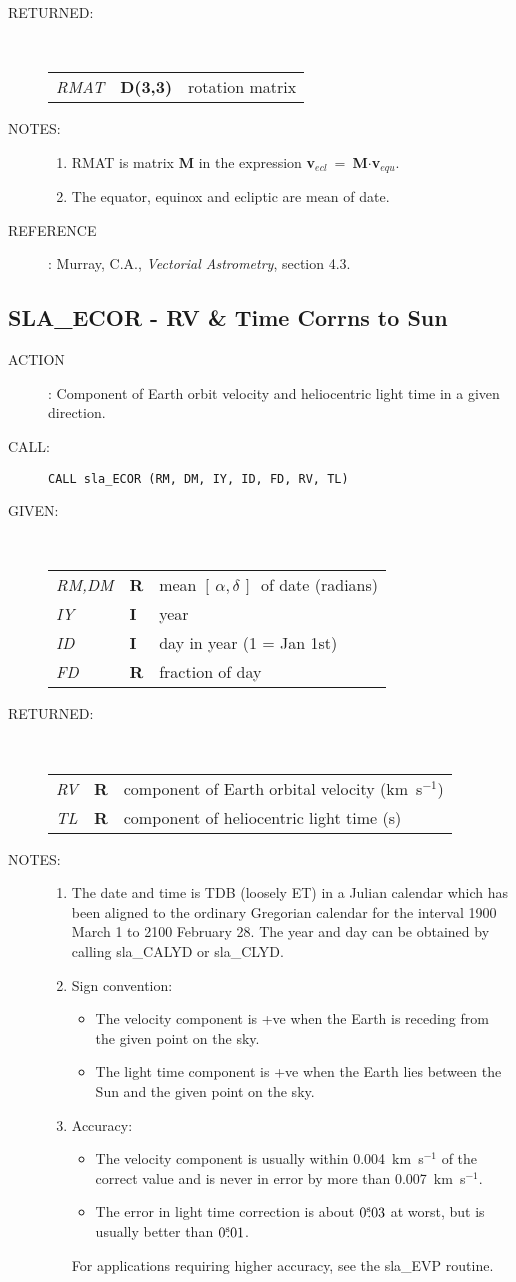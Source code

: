\documentclass[11pt,twoside]{article}
\newcommand{\xlabel}[1]{}
\newcommand{\radec}     {$[\,\alpha,\delta\,]$}
\newcommand{\tseci}[1]   {$#1$\mbox{$^{\rm s}$}}
\newcommand{\tsec}[2]    {\tseci{#1}$\hspace{-0.3em}.#2$}
\renewcommand{\tsec}[2] {$#1^{\rm s}\hspace{-0.3em}.#2$}
\newcommand{\routine}[3]
{\hbadness=10000
  \vbox
  {
    \rule{\textwidth}{0.3mm}\\
    {\Large {\bf #1} \hfill #2 \hfill {\bf #1}}\\
    \setlength{\oldspacing}{\topsep}
    \setlength{\topsep}{0.3ex}
    \begin{description}
      #3
    \end{description}
    \setlength{\topsep}{\oldspacing}
  }
}
\renewcommand{\routine}[3]
   {
      \subsection{#1\xlabel{#1} - #2\label{#1}}
       \begin{description}
         #3
       \end{description}
   }
\newcommand{\action}[1]
{\item[ACTION]: #1}
\newcommand{\action}[1]
   {\item[ACTION:] #1}
\newcommand{\call}[1]
{\item[CALL]: \hspace{0.4em}{\tt #1}}
\newlength{\oldspacing}
\renewcommand{\call}[1]
   {
    \item[CALL:] {\tt #1}
   }
\newcommand{\args}[2]
{
  \goodbreak
  \setlength{\oldspacing}{\topsep}
  \setlength{\topsep}{0.3ex}
  \begin{description}
  \item[#1]:\\[1.5ex]
    \begin{tabular}{p{7em}p{6em}p{22em}}
      #2
    \end{tabular}
  \end{description}
  \setlength{\topsep}{\oldspacing}
}
\renewcommand{\args}[2]
   {
     \begin{description}
        \item[#1:]\\
        \begin{tabular}{p{7em}p{6em}l}
           #2
        \end{tabular}
     \end{description}
   }
\newcommand{\spec}[3]
{
  {\em {#1}} & {\bf \mbox{#2}} & {#3}
}
\newcommand{\notes}[1]
{
  \goodbreak
  \setlength{\oldspacing}{\topsep}
  \setlength{\topsep}{0.3ex}
  \begin{description}
    \item[NOTES]:
        #1
  \end{description}
  \setlength{\topsep}{\oldspacing}
}
\renewcommand{\notes}[1]
   {
      \begin{description}
         \item[NOTES:]
            #1
      \end{description}
   }
\newcommand{\aref}[1]
{
  \goodbreak
  \setlength{\oldspacing}{\topsep}
  \setlength{\topsep}{0.3ex}
  \begin{description}
    \item[REFERENCE]:
        #1
  \end{description}
  \setlength{\topsep}{\oldspacing}
}
\newcommand{\aref}[1]
   {
     \begin{description}
       \item[REFERENCE:]
           #1
     \end{description}
   }
\begin{document}
\args{RETURNED}
{
 \spec{RMAT}{D(3,3)}{rotation matrix}
}
\notes
{
 \begin{enumerate}
  \item RMAT is matrix {\bf M} in the expression
        {\bf v}$_{ecl}$~=~{\bf M}$\cdot${\bf v}$_{equ}$.
  \item The equator, equinox and ecliptic are mean of date.
 \end{enumerate}
}
\aref{Murray, C.A., {\it Vectorial Astrometry}, section 4.3.}
\routine{SLA\_ECOR}{RV \& Time Corrns to Sun}
{
 \action{Component of Earth orbit velocity and heliocentric
         light time in a given direction.}
 \call{CALL sla\_ECOR (RM, DM, IY, ID, FD, RV, TL)}
}
\args{GIVEN}
{
 \spec{RM,DM}{R}{mean \radec\ of date (radians)} \\
 \spec{IY}{I}{year} \\
 \spec{ID}{I}{day in year (1 = Jan 1st)} \\
 \spec{FD}{R}{fraction of day}
}
\args{RETURNED}
{
 \spec{RV}{R}{component of Earth orbital velocity (km~s$^{-1}$)} \\
 \spec{TL}{R}{component of heliocentric light time (s)}
}
\notes
{
 \begin{enumerate}
  \item The date and time is TDB (loosely ET) in a Julian calendar
        which has been aligned to the ordinary Gregorian
        calendar for the interval 1900 March 1 to 2100 February 28.
        The year and day can be obtained by calling sla\_CALYD or
        sla\_CLYD.
  \item Sign convention:
        \begin{itemize}
         \item The velocity component is +ve when the
               Earth is receding from
               the given point on the sky.
         \item The light time component is +ve
               when the Earth lies between the Sun and
               the given point on the sky.
        \end{itemize}
 \item Accuracy:
       \begin{itemize}
        \item The velocity component is usually within 0.004~km~s$^{-1}$
              of the correct value and is never in error by more than
              0.007~km~s$^{-1}$.
        \item The error in light time correction is about
              \tsec{0}{03} at worst,
              but is usually better than \tsec{0}{01}.
       \end{itemize}
       For applications requiring higher accuracy, see the sla\_EVP routine.
 \end{enumerate}
}
\end{document}
